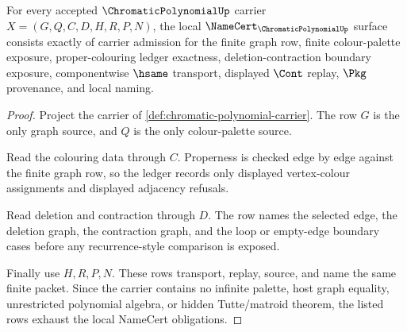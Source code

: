 \begin{theorem}
\label{thm:chromatic-polynomial-namecert-obligations}
For every accepted $\ChromaticPolynomialUp$ carrier $X=(G,Q,C,D,H,R,P,N)$, the local $\NameCert_{\ChromaticPolynomialUp}$ surface consists exactly of carrier admission for the finite graph row, finite colour-palette exposure, proper-colouring ledger exactness, deletion-contraction boundary exposure, componentwise $\hsame$ transport, displayed $\Cont$ replay, $\Pkg$ provenance, and local naming.
\end{theorem}
\begin{proof}
Project the carrier of \autoref{def:chromatic-polynomial-carrier}. The row $G$ is the only graph source, and $Q$ is the only colour-palette source.

Read the colouring data through $C$. Properness is checked edge by edge against the finite graph row, so the ledger records only displayed vertex-colour assignments and displayed adjacency refusals.

Read deletion and contraction through $D$. The row names the selected edge, the deletion graph, the contraction graph, and the loop or empty-edge boundary cases before any recurrence-style comparison is exposed.

Finally use $H,R,P,N$. These rows transport, replay, source, and name the same finite packet. Since the carrier contains no infinite palette, host graph equality, unrestricted polynomial algebra, or hidden Tutte/matroid theorem, the listed rows exhaust the local NameCert obligations.
\end{proof}

